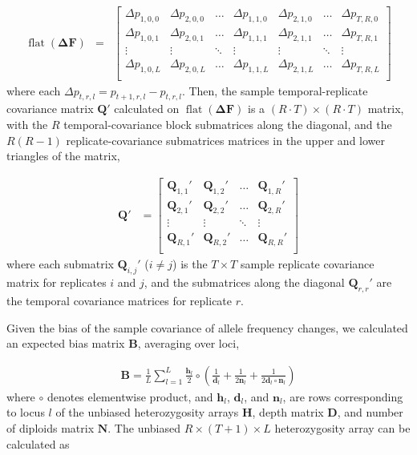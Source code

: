 \documentclass[11pt]{article}
\DeclareMathOperator{\flt}{\mathrm{flat}}
\begin{document}
\begin{align}
    \flt(\mathbf{\Delta F}) &=
                    &\begin{bmatrix} 
    \Delta p_{1, 0, 0} & \Delta p_{2, 0, 0} & \ldots & \Delta p_{1, 1, 0} & \Delta p_{2, 1, 0} & \ldots & \Delta p_{T, R, 0}  \\
    \Delta p_{1, 0, 1} & \Delta p_{2, 0, 1} & \ldots & \Delta p_{1, 1, 1} & \Delta p_{2, 1, 1} & \ldots & \Delta p_{T, R, 1}  \\
    \vdots & \vdots & \ddots & \vdots & \vdots & \ddots & \vdots  \\
    \Delta p_{1, 0, L} & \Delta p_{2, 0, L} & \ldots & \Delta p_{1, 1, L} & \Delta p_{2, 1, L} & \ldots & \Delta p_{T, R, L}  \\
  \end{bmatrix} 
\end{align}
%
where each $\Delta p_{t, r, l} = p_{t+1, r, l} - p_{t, r, l}$. Then, the sample
temporal-replicate covariance matrix $\mathbf{Q}'$ calculated on
$\flt(\mathbf{\Delta F})$ is a $(R \cdot T) \times (R \cdot T)$ matrix, with
the $R$ temporal-covariance block submatrices along the diagonal, and the
$R(R-1)$ replicate-covariance submatrices matrices in the upper and lower
triangles of the matrix,

\begin{align}
	\mathbf{Q}' &= 
  \begin{bmatrix} 
		\mathbf{Q}_{1,1}' & \mathbf{Q}_{1, 2}' & \ldots & \mathbf{Q}_{1, R}' \\ 
		\mathbf{Q}_{2,1}' & \mathbf{Q}_{2, 2}' & \ldots & \mathbf{Q}_{2, R}' \\ 
		\vdots & \vdots & \ddots & \vdots \\
		\mathbf{Q}_{R,1}' & \mathbf{Q}_{R, 2}' & \ldots & \mathbf{Q}_{R, R}' \\ 
  \end{bmatrix} 
\end{align}
%
where each submatrix $\mathbf{Q}_{i,j}'$ ($i \ne j$) is the $T \times T$ sample
replicate covariance matrix for replicates $i$ and $j$, and the submatrices
along the diagonal $\mathbf{Q}_{r,r}'$ are the temporal covariance matrices for
replicate $r$.

Given the bias of the sample covariance of allele frequency changes, we
calculated an expected bias matrix $\mathbf{B}$, averaging over loci,

\begin{align}
  \mathbf{B} = \frac{1}{L} \sum_{l=1}^L \frac{\mathbf{h}_l}{2} \circ \left( \frac{1}{\mathbf{d}_l} + \frac{1}{2\mathbf{n}_l} + \frac{1}{2\mathbf{d}_l \circ \mathbf{n}_l} \right)
\end{align}
%
where $\circ$ denotes elementwise product, and $\mathbf{h}_l$, $\mathbf{d}_l$,
and $\mathbf{n}_l$, are rows corresponding to locus $l$ of the unbiased
heterozygosity arrays $\mathbf{H}$, depth matrix $\mathbf{D}$, and number of
diploids matrix $\mathbf{N}$. The unbiased $R \times (T+1) \times L$
heterozygosity array can be calculated as  
\end{document}
